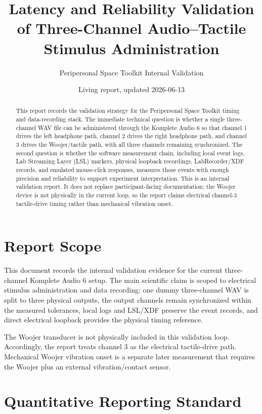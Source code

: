 \documentclass[11pt]{article}
\title{Latency and Reliability Validation of Three-Channel Audio--Tactile Stimulus Administration}
\author{Peripersonal Space Toolkit Internal Validation}
\date{Living report, updated 2026-06-13}
\begin{document}
\maketitle

\begin{abstract}
This report records the validation strategy for the Peripersonal Space Toolkit
timing and data-recording stack. The immediate technical question is whether a
single three-channel WAV file can be administered through the Komplete Audio 6
so that channel 1 drives the left headphone path, channel 2 drives the right
headphone path, and channel 3 drives the Woojer/tactile path, with all three
channels remaining synchronized. The second question is whether the software
measurement chain, including local event logs, Lab Streaming Layer (LSL)
markers, physical loopback recordings, LabRecorder/XDF records, and emulated
mouse-click responses, measures those events with enough precision and
reliability to support experiment interpretation. This is an internal
validation report. It does not replace participant-facing documentation; the
Woojer device is not physically in the current loop, so the report claims
electrical channel-3 tactile-drive timing rather than mechanical vibration
onset.
\end{abstract}

\section{Report Scope}

This document records the internal validation evidence for the current
three-channel Komplete Audio 6 setup. The main scientific claim is scoped to
electrical stimulus administration and data recording: one dummy three-channel
WAV is split to three physical outputs, the output channels remain synchronized
within the measured tolerances, local logs and LSL/XDF preserve the event
records, and direct electrical loopback provides the physical timing reference.

The Woojer transducer is not physically included in this validation loop.
Accordingly, the report treats channel 3 as the electrical tactile-drive path.
Mechanical Woojer vibration onset is a separate later measurement that requires
the Woojer plus an external vibration/contact sensor.

\section{Quantitative Reporting Standard}
\end{document}
